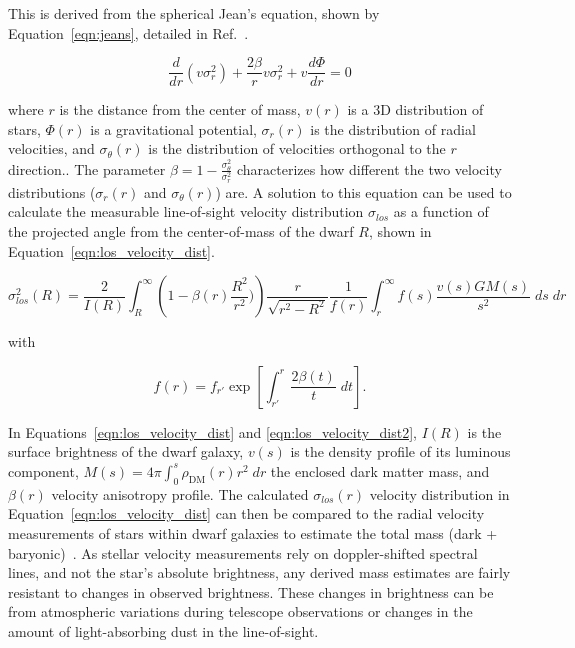     This is derived from the spherical Jean's equation, shown by Equation~\ref{eqn:jeans}, detailed in Ref.~\cite{galactic_dynamics}.
    
    \begin{equation}\label{eqn:jeans}
      \frac{d}{dr} \left ( v \sigma_r^2\right) + \frac{2 \beta}{r}v \sigma_r^2 + v \frac{d \Phi}{dr}=0
    \end{equation}
    
    where $r$ is the distance from the center of mass, $v(r)$ is a 3D distribution of stars, $\Phi(r)$ is a gravitational potential, $\sigma_r(r)$ is the distribution of radial velocities, and $\sigma_\theta(r)$ is the distribution of velocities orthogonal to the $r$ direction..
    The parameter $\beta = 1 - \frac{\sigma_{\theta}^2}{\sigma_r^2}$ characterizes how different the two velocity distributions ($\sigma_r(r)$ and $\sigma_{\theta}(r)$) are.
    A solution to this equation can be used to calculate the measurable line-of-sight velocity distribution $\sigma_{los}$ as a function of the projected angle from the center-of-mass of the dwarf $R$, shown in Equation~\ref{eqn:los_velocity_dist}.
    
    \begin{equation}\label{eqn:los_velocity_dist}
      \sigma_{los}^2 \left ( R \right ) = \frac{2}{I(R)} \int_R^{\infty} \left ( 1 - \beta(r) \frac{R^2}{r^2}) \right ) \frac{r}{\sqrt{r^2-R^2}} \frac{1}{f(r)} \int_r^\infty f(s) \frac{v(s)GM(s)}{s^2} \; ds\; dr
    \end{equation}
    
    with
    
    \begin{equation}\label{eqn:los_velocity_dist2}
      f(r) = f_{r'} \exp \left [ \int_{r'}^r \frac{2 \beta(t) }{t} \; dt \right ] .
    \end{equation}
    
    In Equations~\ref{eqn:los_velocity_dist} and \ref{eqn:los_velocity_dist2}, $I(R)$ is the surface brightness of the dwarf galaxy, $v(s)$ is the density profile of its luminous component, $M(s)=4\pi \int_0^s \rho_{\textrm{DM}}(r) r^2 \; dr$ the enclosed dark matter mass, and $\beta(r)$ velocity anisotropy profile.
    The calculated $\sigma_{los}(r)$ velocity distribution in Equation~\ref{eqn:los_velocity_dist} can then be compared to the radial velocity measurements of stars within dwarf galaxies to estimate the total mass (dark + baryonic)~\cite{dwarf_gal_vel_dispersion,dwarf_gal_vel_dispersion_a,dwarf_jfactors_no_priors}.
    As stellar velocity measurements rely on doppler-shifted spectral lines, and not the star's absolute brightness, any derived mass estimates are fairly resistant to changes in observed brightness.
    These changes in brightness can be from atmospheric variations during telescope observations or changes in the amount of light-absorbing dust in the line-of-sight.

